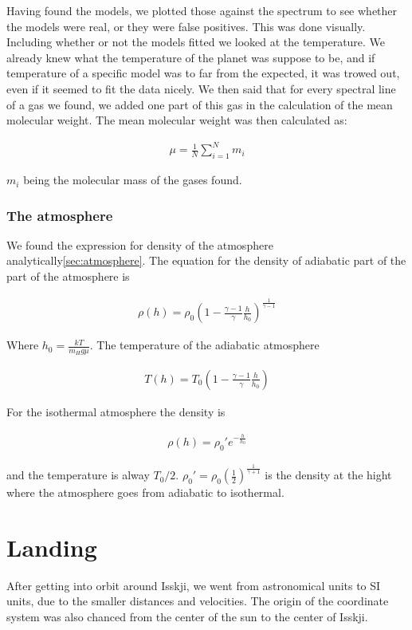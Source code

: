 \documentclass[a4paper, 10pt]{article}
\begin{document}
Having found the models, we plotted those against the spectrum to see whether the models were real, or they were false positives. This was done visually. Including whether or not the models fitted we looked at the temperature. We already knew what the temperature of the planet was suppose to be, and if temperature of a specific model was to far from the expected, it was trowed out, even if it seemed to fit the data nicely. We then said that for every spectral line of a gas we found, we added one part of this gas in the calculation of the mean molecular weight. The mean molecular weight was then calculated as:

\begin{align}
\mu = \frac{1}{N}\sum_{i=1}^N m_i
\end{align}

$m_i$ being the molecular mass of the gases found.

\subsubsection{The atmosphere}
We found the expression for density of the atmosphere analytically\ref{sec:atmosphere}. The equation for the density of adiabatic part of the part of the atmosphere is

\begin{align}
\rho (h) = \rho_0 \left(1-\frac{\gamma - 1}{\gamma} \frac{h}{h_0}\right)^{\frac{1}{\gamma - 1}}
\end{align}


Where $h_0 = \frac{kT}{m_H g \mu}$. The temperature of the adiabatic atmosphere

\begin{align}
T(h) = T_0 \left( 1 -\frac{\gamma - 1}{\gamma} \frac{h}{h_0} \right)
\end{align}

For the isothermal atmosphere the density is

\begin{align}
\rho (h) = \rho_0'e^{-\frac{h}{h_0}}
\end{align}

and the temperature is alway $T_0/2$. $\rho_0' = \rho_0 \left( \frac{1}{2} \right) ^{\frac{1}{\gamma + 1}}$ is the density at the hight where the atmosphere goes from adiabatic to isothermal.


\section{Landing}
After getting into orbit around Isskji, we went from astronomical units to SI units, due to the smaller distances and velocities. The origin of the coordinate system was also chanced from the center of the sun to the center of Isskji.
\end{document}
